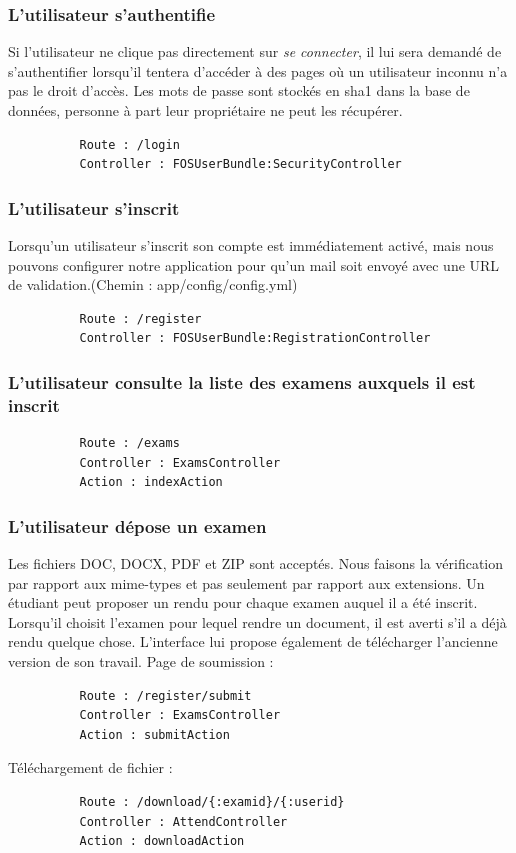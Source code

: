 \documentclass{report}
\begin{document}
      \subsubsection{L'utilisateur s'authentifie}
        Si l'utilisateur ne clique pas directement sur \textsl{se connecter}, il lui sera demandé
        de s'authentifier lorsqu'il tentera d'accéder à des pages où un utilisateur inconnu
        n'a pas le droit d'accès. Les mots de passe sont stockés en sha1 dans la base de données,
        personne à part leur propriétaire ne peut les récupérer.
        \begin{verbatim}
          Route : /login 
          Controller : FOSUserBundle:SecurityController
        \end{verbatim}

      \subsubsection{L'utilisateur s'inscrit}
        Lorsqu’un utilisateur s’inscrit son compte est immédiatement activé, mais
        nous pouvons configurer notre application pour qu’un mail soit envoyé avec une
        URL de validation.(Chemin : app/config/config.yml)
        \begin{verbatim}
          Route : /register 
          Controller : FOSUserBundle:RegistrationController
        \end{verbatim}

      \subsubsection{L'utilisateur consulte la liste des examens auxquels il est inscrit}
        \begin{verbatim}
          Route : /exams 
          Controller : ExamsController
          Action : indexAction
        \end{verbatim}

      \subsubsection{L'utilisateur dépose un examen}
        Les fichiers DOC, DOCX, PDF et ZIP sont acceptés. Nous faisons
        la vérification par rapport aux mime-types et pas seulement par rapport aux extensions.
        Un étudiant peut proposer un rendu pour chaque examen auquel il a été inscrit.
        Lorsqu'il choisit l'examen pour lequel rendre un document, il est averti s'il a
        déjà rendu quelque chose. L'interface lui propose également de télécharger l'ancienne
        version de son travail.
        Page de soumission :
        \begin{verbatim}
          Route : /register/submit
          Controller : ExamsController
          Action : submitAction
        \end{verbatim}
        Téléchargement de fichier :
        \begin{verbatim}
          Route : /download/{:examid}/{:userid}
          Controller : AttendController
          Action : downloadAction
        \end{verbatim}
\end{document}
